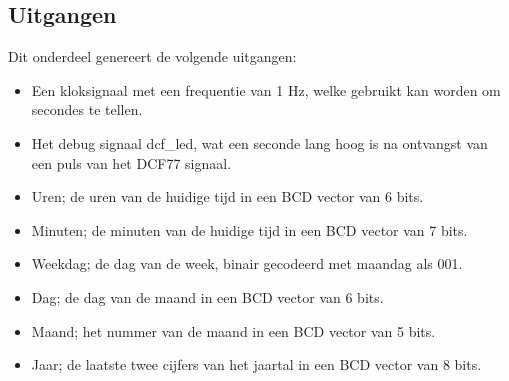 \subsection{Uitgangen}
Dit onderdeel genereert de volgende uitgangen:
\begin{itemize}[nolistsep]
\item Een kloksignaal met een frequentie van 1 Hz, welke gebruikt kan worden om secondes te tellen.
\item Het debug signaal dcf\_led, wat een seconde lang hoog is na ontvangst van een puls van het DCF77 signaal.
\item Uren; de uren van de huidige tijd in een BCD vector van 6 bits.
\item Minuten; de minuten van de huidige tijd in een BCD vector van 7 bits.
\item Weekdag; de dag van de week, binair gecodeerd met maandag als 001.
\item Dag; de dag van de maand in een BCD vector van 6 bits.
\item Maand; het nummer van de maand in een BCD vector van 5 bits.
\item Jaar; de laatste twee cijfers van het jaartal in een BCD vector van 8 bits.
\end{itemize}

